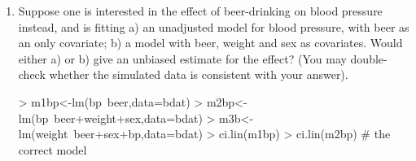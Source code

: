\begin{enumerate}
\item Suppose one is interested in the effect of beer-drinking on blood pressure instead, and is fitting a) an unadjusted model  for blood pressure, with beer as an only covariate; b) a model with beer, weight and sex as covariates. Would either a) or b) give an unbiased estimate for the effect? (You may double-check whether the simulated data is consistent with your answer).

\begin{Schunk}
\begin{Sinput}
> m1bp<-lm(bp~beer,data=bdat)
> m2bp<-lm(bp~beer+weight+sex,data=bdat)
> m3b<-lm(weight~beer+sex+bp,data=bdat)
> ci.lin(m1bp)
> ci.lin(m2bp)    # the correct model
\end{Sinput}
\end{Schunk}


\end{enumerate}


